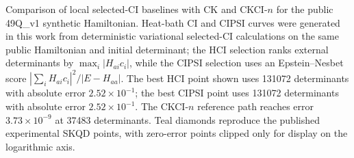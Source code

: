Comparison of local selected-CI baselines with CK and CKCI-$n$ for the public 49Q\_v1 synthetic Hamiltonian. Heat-bath CI and CIPSI curves were generated in this work from deterministic variational selected-CI calculations on the same public Hamiltonian and initial determinant; the HCI selection ranks external determinants by $\max_i |H_{ai} c_i|$, while the CIPSI selection uses an Epstein--Nesbet score $|\sum_i H_{ai} c_i|^2/|E-H_{aa}|$. The best HCI point shown uses 131072 determinants with absolute error $2.52 \times 10^{-1}$; the best CIPSI point uses 131072 determinants with absolute error $2.52 \times 10^{-1}$. The CKCI-$n$ reference path reaches error $3.73 \times 10^{-9}$ at 37483 determinants. Teal diamonds reproduce the published experimental SKQD points, with zero-error points clipped only for display on the logarithmic axis.
